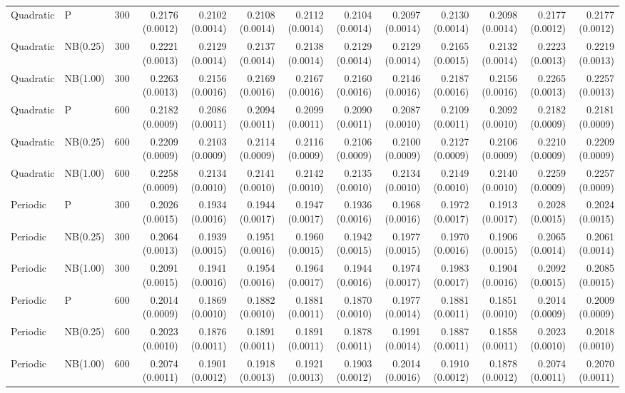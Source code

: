 \begin{table}[p]
{\begin{tabular}{lllrrrrrrrrrr}
\hline
Quadratic & P & 300 & 0.2176 (0.0012) & 0.2102 (0.0014) & 0.2108 (0.0014) & 0.2112 (0.0014) & 0.2104 (0.0014) & 0.2097 (0.0014) & 0.2130 (0.0014) & 0.2098 (0.0014) & 0.2177 (0.0012) & 0.2177 (0.0012) \\
Quadratic & NB(0.25) & 300 & 0.2221 (0.0013) & 0.2129 (0.0014) & 0.2137 (0.0014) & 0.2138 (0.0014) & 0.2129 (0.0014) & 0.2129 (0.0014) & 0.2165 (0.0015) & 0.2132 (0.0014) & 0.2223 (0.0013) & 0.2219 (0.0013) \\
Quadratic & NB(1.00) & 300 & 0.2263 (0.0013) & 0.2156 (0.0016) & 0.2169 (0.0016) & 0.2167 (0.0016) & 0.2160 (0.0016) & 0.2146 (0.0016) & 0.2187 (0.0016) & 0.2156 (0.0016) & 0.2265 (0.0013) & 0.2257 (0.0013) \\
Quadratic & P & 600 & 0.2182 (0.0009) & 0.2086 (0.0011) & 0.2094 (0.0011) & 0.2099 (0.0011) & 0.2090 (0.0011) & 0.2087 (0.0010) & 0.2109 (0.0011) & 0.2092 (0.0010) & 0.2182 (0.0009) & 0.2181 (0.0009) \\
Quadratic & NB(0.25) & 600 & 0.2209 (0.0009) & 0.2103 (0.0009) & 0.2114 (0.0009) & 0.2116 (0.0009) & 0.2106 (0.0009) & 0.2100 (0.0009) & 0.2127 (0.0009) & 0.2106 (0.0009) & 0.2210 (0.0009) & 0.2209 (0.0009) \\
Quadratic & NB(1.00) & 600 & 0.2258 (0.0009) & 0.2134 (0.0010) & 0.2141 (0.0010) & 0.2142 (0.0010) & 0.2135 (0.0010) & 0.2134 (0.0010) & 0.2149 (0.0010) & 0.2140 (0.0010) & 0.2259 (0.0009) & 0.2257 (0.0009) \\
\hline
Periodic & P & 300 & 0.2026 (0.0015) & 0.1934 (0.0016) & 0.1944 (0.0017) & 0.1947 (0.0017) & 0.1936 (0.0016) & 0.1968 (0.0016) & 0.1972 (0.0017) & 0.1913 (0.0017) & 0.2028 (0.0015) & 0.2024 (0.0015) \\
Periodic & NB(0.25) & 300 & 0.2064 (0.0013) & 0.1939 (0.0015) & 0.1951 (0.0016) & 0.1960 (0.0015) & 0.1942 (0.0015) & 0.1977 (0.0015) & 0.1970 (0.0016) & 0.1906 (0.0015) & 0.2065 (0.0014) & 0.2061 (0.0014) \\
Periodic & NB(1.00) & 300 & 0.2091 (0.0015) & 0.1941 (0.0016) & 0.1954 (0.0016) & 0.1964 (0.0017) & 0.1944 (0.0016) & 0.1974 (0.0017) & 0.1983 (0.0017) & 0.1904 (0.0016) & 0.2092 (0.0015) & 0.2085 (0.0015) \\
Periodic & P & 600 & 0.2014 (0.0009) & 0.1869 (0.0010) & 0.1882 (0.0010) & 0.1881 (0.0011) & 0.1870 (0.0010) & 0.1977 (0.0014) & 0.1881 (0.0011) & 0.1851 (0.0010) & 0.2014 (0.0009) & 0.2009 (0.0009) \\
Periodic & NB(0.25) & 600 & 0.2023 (0.0010) & 0.1876 (0.0011) & 0.1891 (0.0011) & 0.1891 (0.0011) & 0.1878 (0.0011) & 0.1991 (0.0014) & 0.1887 (0.0011) & 0.1858 (0.0011) & 0.2023 (0.0010) & 0.2018 (0.0010) \\
Periodic & NB(1.00) & 600 & 0.2074 (0.0011) & 0.1901 (0.0012) & 0.1918 (0.0013) & 0.1921 (0.0013) & 0.1903 (0.0012) & 0.2014 (0.0016) & 0.1910 (0.0012) & 0.1878 (0.0012) & 0.2074 (0.0011) & 0.2070 (0.0011) \\
\hline
\end{tabular}%
}
\end{table}


